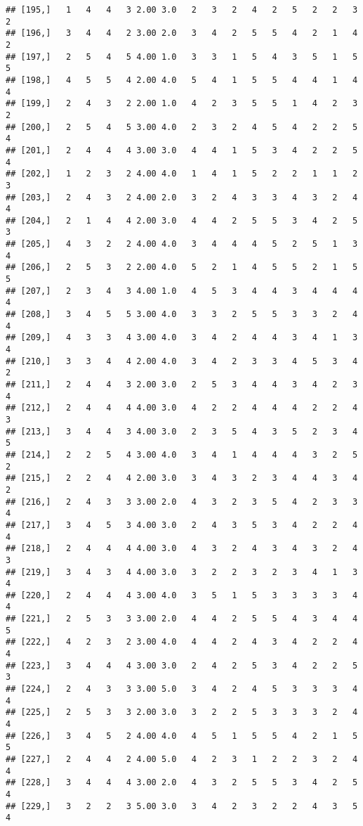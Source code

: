 \documentclass[]{article}
\begin{document}
\begin{verbatim}
## [195,]   1   4   4   3 2.00 3.0   2   3   2   4   2   5   2   2   3   2
## [196,]   3   4   4   2 3.00 2.0   3   4   2   5   5   4   2   1   4   2
## [197,]   2   5   4   5 4.00 1.0   3   3   1   5   4   3   5   1   5   5
## [198,]   4   5   5   4 2.00 4.0   5   4   1   5   5   4   4   1   4   4
## [199,]   2   4   3   2 2.00 1.0   4   2   3   5   5   1   4   2   3   2
## [200,]   2   5   4   5 3.00 4.0   2   3   2   4   5   4   2   2   5   4
## [201,]   2   4   4   4 3.00 3.0   4   4   1   5   3   4   2   2   5   4
## [202,]   1   2   3   2 4.00 4.0   1   4   1   5   2   2   1   1   2   3
## [203,]   2   4   3   2 4.00 2.0   3   2   4   3   3   4   3   2   4   4
## [204,]   2   1   4   4 2.00 3.0   4   4   2   5   5   3   4   2   5   3
## [205,]   4   3   2   2 4.00 4.0   3   4   4   4   5   2   5   1   3   4
## [206,]   2   5   3   2 2.00 4.0   5   2   1   4   5   5   2   1   5   5
## [207,]   2   3   4   3 4.00 1.0   4   5   3   4   4   3   4   4   4   4
## [208,]   3   4   5   5 3.00 4.0   3   3   2   5   5   3   3   2   4   4
## [209,]   4   3   3   4 3.00 4.0   3   4   2   4   4   3   4   1   3   4
## [210,]   3   3   4   4 2.00 4.0   3   4   2   3   3   4   5   3   4   2
## [211,]   2   4   4   3 2.00 3.0   2   5   3   4   4   3   4   2   3   4
## [212,]   2   4   4   4 4.00 3.0   4   2   2   4   4   4   2   2   4   3
## [213,]   3   4   4   3 4.00 3.0   2   3   5   4   3   5   2   3   4   5
## [214,]   2   2   5   4 3.00 4.0   3   4   1   4   4   4   3   2   5   2
## [215,]   2   2   4   4 2.00 3.0   3   4   3   2   3   4   4   3   4   2
## [216,]   2   4   3   3 3.00 2.0   4   3   2   3   5   4   2   3   3   4
## [217,]   3   4   5   3 4.00 3.0   2   4   3   5   3   4   2   2   4   4
## [218,]   2   4   4   4 4.00 3.0   4   3   2   4   3   4   3   2   4   3
## [219,]   3   4   3   4 4.00 3.0   3   2   2   3   2   3   4   1   3   4
## [220,]   2   4   4   4 3.00 4.0   3   5   1   5   3   3   3   3   4   4
## [221,]   2   5   3   3 3.00 2.0   4   4   2   5   5   4   3   4   4   5
## [222,]   4   2   3   2 3.00 4.0   4   4   2   4   3   4   2   2   4   4
## [223,]   3   4   4   4 3.00 3.0   2   4   2   5   3   4   2   2   5   3
## [224,]   2   4   3   3 3.00 5.0   3   4   2   4   5   3   3   3   4   4
## [225,]   2   5   3   3 2.00 3.0   3   2   2   5   3   3   3   2   4   4
## [226,]   3   4   5   2 4.00 4.0   4   5   1   5   5   4   2   1   5   5
## [227,]   2   4   4   2 4.00 5.0   4   2   3   1   2   2   3   2   4   4
## [228,]   3   4   4   4 3.00 2.0   4   3   2   5   5   3   4   2   5   4
## [229,]   3   2   2   3 5.00 3.0   3   4   2   3   2   2   4   3   5   4

\end{verbatim}
\end{document}
